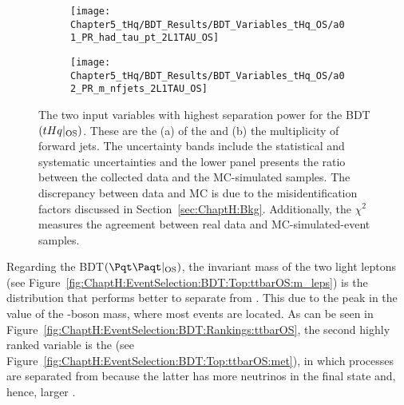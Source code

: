 \begin{figure}[h]
\centering
\begin{subfigure}{.475\textwidth}
  \centering
  \texttt{[image: Chapter5\_tHq/BDT\_Results/BDT\_Variables\_tHq\_OS/a01\_PR\_had\_tau\_pt\_2L1TAU\_OS]}
  \caption{}
  \label{fig:ChaptH:EventSelection:BDT:Top:tHqOS:pt}
\end{subfigure}%
\begin{subfigure}{.475\textwidth}
  \centering
  \texttt{[image: Chapter5\_tHq/BDT\_Results/BDT\_Variables\_tHq\_OS/a02\_PR\_m\_nfjets\_2L1TAU\_OS]}
  \caption{}
  \label{fig:ChaptH:EventSelection:BDT:Top:tHqOS:n_fjets}
\end{subfigure}
\caption{The two input variables with highest separation power for the BDT$(tHq|_{\text{OS}})$. 
These are the (a) \pT of the \tauhad and (b) the multiplicity of forward jets.
The uncertainty bands include 
the statistical and systematic uncertainties and the lower panel presents the ratio between the collected data and the MC-simulated samples.
The discrepancy between data and MC is due to the misidentification factors discussed in Section~\ref{sec:ChaptH:Bkg}.
Additionally, the $\chi^2$ measures the agreement between real data and MC-simulated-event samples.}
\label{fig:ChaptH:EventSelection:BDT:Top:tHqOS}
\end{figure}



Regarding the BDT$(\ttbar|_{\text{OS}})$, the invariant mass of the two light leptons (see 
Figure~\ref{fig:ChaptH:EventSelection:BDT:Top:ttbarOS:m_leps}) is the distribution that 
performs better to separate \ttbar from \Zjets. This due to the peak in the value of the
\PZ-boson mass, where most \Zjets events are located. As can be seen in Figure~\ref{fig:ChaptH:EventSelection:BDT:Rankings:ttbarOS},
the second highly ranked variable is the \MET (see Figure~\ref{fig:ChaptH:EventSelection:BDT:Top:ttbarOS:met}), in which \Zjets processes are separated
from \ttbar because the latter has more neutrinos in the final state and, hence, larger \MET.



